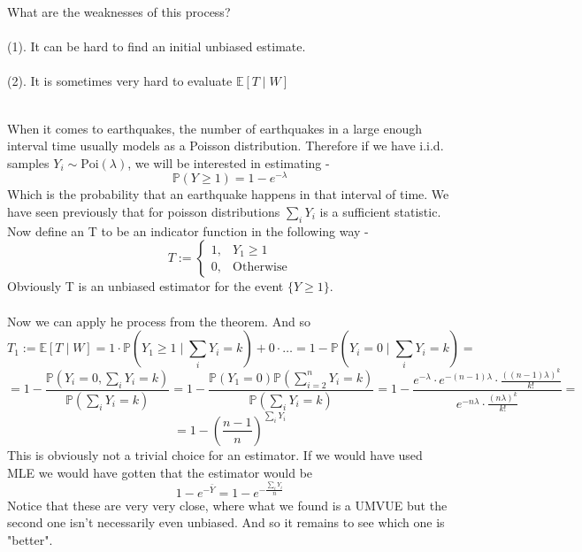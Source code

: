\documentclass[../main.tex]{subfiles}
\begin{document}
What are the weaknesses of this process? \\\\
(1). It can be hard to find an initial unbiased estimate. \\\\
(2). It is sometimes very hard to evaluate $\mathbb{E}[T\mid W]$\\\\
\begin{example}
When it comes to earthquakes, the number of earthquakes in a large enough interval time usually models as a Poisson distribution. Therefore if we have i.i.d. samples $Y_i\sim\text{Poi}(\lambda)$, we will be interested in estimating - 
\[\mathbb{P}(Y\geq 1) = 1-e^{-\lambda}\]
Which is the probability that an earthquake happens in that interval of time. We have seen previously that for poisson distributions $\sum_i Y_i$ is a sufficient statistic. Now define an T to be an indicator function in the following way - 
\[T := \begin{cases} 1, & Y_1\geq 1 \\ 0, & \text{Otherwise} \end{cases}\]
Obviously T is an unbiased estimator for the event $\{Y\geq 1\}$. \\\\
Now we can apply he process from the theorem. And so
\[T_1:= \mathbb{E}[T\mid W] = 1\cdot \mathbb{P}\left(Y_1\geq 1\mid \sum_i Y_i =k\right) + 0 \cdot \dots = 1-\mathbb{P}\left(Y_i =0\mid \sum_i Y_i =k\right) =\]\[= 1-\frac{\mathbb{P}(Y_i=0, \sum_i Y_i = k)}{\mathbb{P}(\sum_i Y_i = k )} = 1 - \frac{\mathbb{P}(Y_1=0)\mathbb{P}(\sum_{i=2}^n Y_i = k)}{\mathbb{P}(\sum_i Y_i =k)} = 1-\frac{e^{-\lambda}\cdot e^{-(n-1)\lambda}\cdot \frac{((n-1)\lambda)^k}{k!}}{e^{-n\lambda}\cdot \frac{(n\lambda)^k}{k!}} =\]\[= 1-\left(\frac{n-1}{n}\right)^{\sum_i Y_i}\]
This is obviously not a trivial choice for an estimator. If we would have used MLE we would have gotten that the estimator would be 
\[1-e^{-\bar{Y}} = 1 - e^{-\frac{\sum_i Y_i}{n}}\]
Notice that these are very very close, where what we found is a UMVUE but the second one isn't necessarily even unbiased. And so it remains to see which one is "better". 
\end{example}
\end{document}
